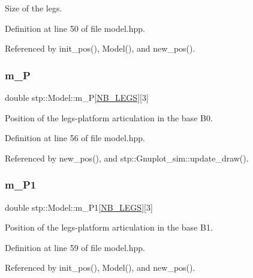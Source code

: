 Size of the legs. 

Definition at line 50 of file model.\+hpp.



Referenced by init\+\_\+pos(), Model(), and new\+\_\+pos().

\mbox{\label{classstp_1_1_model_a773d6f9a6ee4f6dd580229e0dc3d741c}} 
\subsubsection{\texorpdfstring{m\+\_\+P}{m\_P}}
{\footnotesize\ttfamily double stp\+::\+Model\+::m\+\_\+P\mbox{[}\hyperlink{model_8hpp_ae44092ed043cb4350e2df47fdee890b9}{N\+B\+\_\+\+L\+E\+GS}\mbox{]}\mbox{[}3\mbox{]}\hspace{0.3cm}{\ttfamily [protected]}}

Position of the legs-\/platform articulation in the base B0. 

Definition at line 56 of file model.\+hpp.



Referenced by new\+\_\+pos(), and stp\+::\+Gnuplot\+\_\+sim\+::update\+\_\+draw().

\mbox{\label{classstp_1_1_model_a82e25ba756ecbe2f929505ef4d97b317}} 
\subsubsection{\texorpdfstring{m\+\_\+\+P1}{m\_P1}}
{\footnotesize\ttfamily double stp\+::\+Model\+::m\+\_\+\+P1\mbox{[}\hyperlink{model_8hpp_ae44092ed043cb4350e2df47fdee890b9}{N\+B\+\_\+\+L\+E\+GS}\mbox{]}\mbox{[}3\mbox{]}\hspace{0.3cm}{\ttfamily [protected]}}

Position of the legs-\/platform articulation in the base B1. 

Definition at line 59 of file model.\+hpp.



Referenced by init\+\_\+pos(), Model(), and new\+\_\+pos().

\mbox{\label{classstp_1_1_model_a3c26b01a6c5e533e25ec3de71c7f132c}} 
